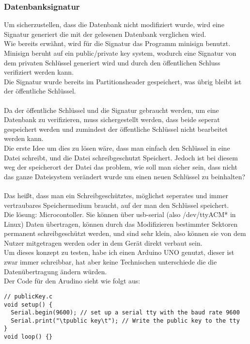 \subsubsection{Datenbanksignatur}
Um sicherzustellen, dass die Datenbank nicht modifiziert wurde, wird eine Signatur generiert die mit der gelesenen Datenbank verglichen wird.\\
Wie bereits erwähnt, wird für die Signatur das Programm minisign benutzt. Minisign beruht auf ein public/private key system, wodurch eine Signatur von dem privaten Schlüssel generiert wird und durch den öffentlichen Schluss verifiziert werden kann.\\
Die Signatur wurde bereits im Partitionsheader gespeichert, was übrig bleibt ist der öffentliche Schlüssel.\\
\\
Da der öffentliche Schlüssel und die Signatur gebraucht werden, um eine Datenbank zu verifizieren, muss sichergestellt werden, dass beide seperat gespeichert werden und zumindest der öffentliche Schlüssel nicht bearbeitet werden kann.\\
Die erste Idee um dies zu lösen wäre, dass man einfach den Schlüssel in eine Datei schreibt, und die Datei schreibgeschutzt Speichert. Jedoch ist bei diesem weg der speicherort der Datei das problem, wie soll man sicher sein, dass nicht das ganze Dateisystem verändert wurde um einen neuen Schlüssel zu beinhalten?
\\
\\
Das heißt, dass man ein Schreibgeschütztes, möglichst seperates und immer vertraubares Speichermedium braucht, auf der man den Schlüssel speichert.\\
Die lösung: Microcontoller. Sie können über usb-serial (also /dev/ttyACM* in Linux) Daten übertragen, können durch das Modifizieren bestimmter Sektoren permanent schreibgeschützt werden, und sind sehr klein, also können sie von dem Nutzer mitgetragen werden oder in dem Gerät direkt verbaut sein.
\\
Um dieses konzept zu testen, habe ich einen Arduino UNO genutzt, dieser ist zwar immer schreibbar, hat aber keine Technischen unterschiede die die Datenübertragung ändern würden.
\\
Der Code für den Arudino sieht wie folgt aus:
\begin{verbatim}
// publicKey.c
void setup() {
  Serial.begin(9600); // set up a serial tty with the baud rate 9600
  Serial.print("\tpublic key\t"); // Write the public key to the tty
}
void loop() {}
\end{verbatim}

